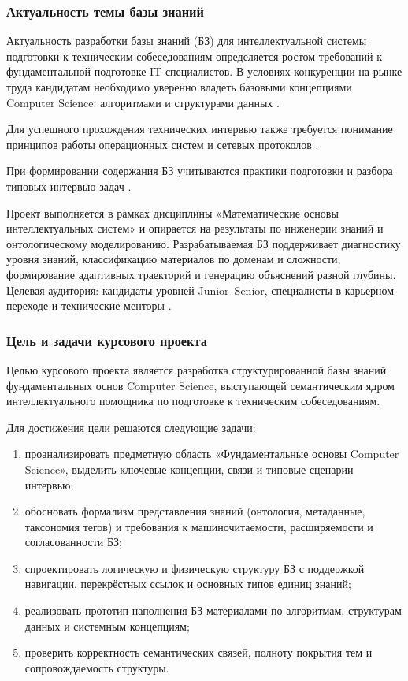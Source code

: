 
\subsubsection*{Актуальность темы базы знаний}
    Актуальность разработки базы знаний (БЗ) для интеллектуальной системы подготовки к техническим собеседованиям определяется ростом требований к фундаментальной подготовке IT-специалистов. В условиях конкуренции на рынке труда кандидатам необходимо уверенно владеть базовыми концепциями Computer Science: алгоритмами и структурами данных \cite{Cormen2013}. 

    Для успешного прохождения технических интервью также требуется понимание принципов работы операционных систем и сетевых протоколов \cite{Tanenbaum2012}. 

    При формировании содержания БЗ учитываются практики подготовки и разбора типовых интервью-задач \cite{McDowell2015}. 

    Проект выполняется в рамках дисциплины «Математические основы интеллектуальных систем» и опирается на результаты по инженерии знаний и онтологическому моделированию. Разрабатываемая БЗ поддерживает диагностику уровня знаний, классификацию материалов по доменам и сложности, формирование адаптивных траекторий и генерацию объяснений разной глубины. Целевая аудитория: кандидаты уровней Junior--Senior, специалисты в карьерном переходе и технические менторы \cite{Golenkov2022}. 

\subsubsection*{Цель и задачи курсового проекта}
    Целью курсового проекта является разработка структурированной базы знаний фундаментальных основ Computer Science, выступающей семантическим ядром интеллектуального помощника по подготовке к техническим собеседованиям.

    Для достижения цели решаются следующие задачи:
    \begin{enumerate}
        \item проанализировать предметную область «Фундаментальные основы Computer Science», выделить ключевые концепции, связи и типовые сценарии интервью;
        \item обосновать формализм представления знаний (онтология, метаданные, таксономия тегов) и требования к машиночитаемости, расширяемости и согласованности БЗ;
        \item спроектировать логическую и физическую структуру БЗ с поддержкой навигации, перекрёстных ссылок и основных типов единиц знаний;
        \item реализовать прототип наполнения БЗ материалами по алгоритмам, структурам данных и системным концепциям;
        \item проверить корректность семантических связей, полноту покрытия тем и сопровождаемость структуры.
    \end{enumerate}

